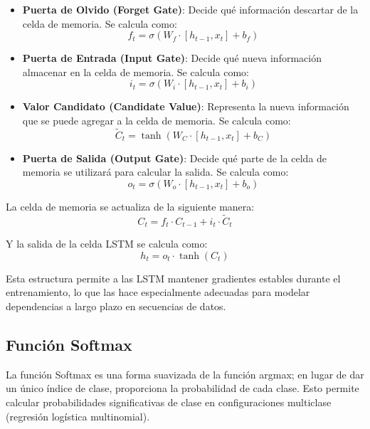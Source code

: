 \begin{itemize}
    \item \textbf{Puerta de Olvido (Forget Gate)}: Decide qué información descartar de la celda de memoria. Se calcula como:
    \begin{equation}
        f_t = \sigma(W_f \cdot [h_{t-1}, x_t] + b_f)
    \end{equation}
    \item \textbf{Puerta de Entrada (Input Gate)}: Decide qué nueva información almacenar en la celda de memoria. Se calcula como:
    \begin{equation}
        i_t = \sigma(W_i \cdot [h_{t-1}, x_t] + b_i)
    \end{equation}
    \item \textbf{Valor Candidato (Candidate Value)}: Representa la nueva información que se puede agregar a la celda de memoria. Se calcula como:
    \begin{equation}
        \tilde{C}_t = \tanh(W_C \cdot [h_{t-1}, x_t] + b_C)
    \end{equation}
    \item \textbf{Puerta de Salida (Output Gate)}: Decide qué parte de la celda de memoria se utilizará para calcular la salida. Se calcula como:
    \begin{equation}
        o_t = \sigma(W_o \cdot [h_{t-1}, x_t] + b_o)
    \end{equation}
\end{itemize}

La celda de memoria se actualiza de la siguiente manera:
\begin{equation}
    C_t = f_t \cdot C_{t-1} + i_t \cdot \tilde{C}_t
\end{equation}

Y la salida de la celda LSTM se calcula como:
\begin{equation}
    h_t = o_t \cdot \tanh(C_t)
\end{equation}

Esta estructura permite a las LSTM mantener gradientes estables durante el entrenamiento, lo que las hace especialmente adecuadas para modelar dependencias a largo plazo en secuencias de datos.

\newpage
\subsection{Función Softmax}
La función Softmax es una forma suavizada de la función argmax; en lugar de dar un único índice de clase, proporciona la probabilidad de cada clase. Esto permite calcular probabilidades significativas de clase en configuraciones multiclase (regresión logística multinomial).

